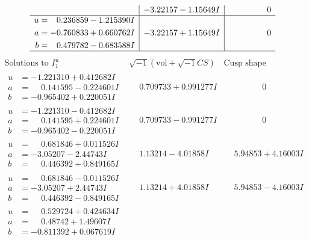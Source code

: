 \documentclass[1p]{elsarticle_modified}
\theoremstyle{definition}
\newcommand{\I}{\sqrt{-1}}
\begin{document}
$$\begin{array}{c|c|c}
 & -3.22157 - 1.15649 I & \phantom{-0.000000 } 0 \\ \hline\begin{aligned}
u &= \phantom{-}0.236859 - 1.215390 I \\
a &= -0.760833 + 0.660762 I \\
b &= \phantom{-}0.479782 - 0.683588 I\end{aligned}
 & -3.22157 + 1.15649 I & \phantom{-0.000000 } 0\\
 \hline 
 \end{array}$$\newpage$$\begin{array}{c|c|c}  
\text{Solutions to }I^u_{1}& \I (\text{vol} + \sqrt{-1}CS) & \text{Cusp shape}\\
 \hline 
\begin{aligned}
u &= -1.221310 + 0.412682 I \\
a &= \phantom{-}0.141595 - 0.224601 I \\
b &= -0.965402 + 0.220051 I\end{aligned}
 & \phantom{-}0.709733 + 0.991277 I & \phantom{-0.000000 } 0 \\ \hline\begin{aligned}
u &= -1.221310 - 0.412682 I \\
a &= \phantom{-}0.141595 + 0.224601 I \\
b &= -0.965402 - 0.220051 I\end{aligned}
 & \phantom{-}0.709733 - 0.991277 I & \phantom{-0.000000 } 0 \\ \hline\begin{aligned}
u &= \phantom{-}0.681846 + 0.011526 I \\
a &= -3.05207 - 2.44743 I \\
b &= \phantom{-}0.446392 + 0.849165 I\end{aligned}
 & \phantom{-}1.13214 - 4.01858 I & \phantom{-}5.94853 + 4.16003 I \\ \hline\begin{aligned}
u &= \phantom{-}0.681846 - 0.011526 I \\
a &= -3.05207 + 2.44743 I \\
b &= \phantom{-}0.446392 - 0.849165 I\end{aligned}
 & \phantom{-}1.13214 + 4.01858 I & \phantom{-}5.94853 - 4.16003 I \\ \hline\begin{aligned}
u &= \phantom{-}0.529724 + 0.424634 I \\
a &= \phantom{-}0.48742 + 1.49607 I \\
b &= -0.811392 + 0.067619 I\end{aligned}

\end{array}$$
\end{document}
